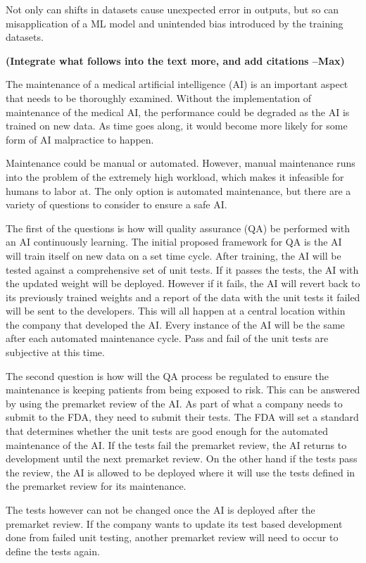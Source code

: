\documentclass[]{article}
\begin{document}
		Not only can shifts in datasets cause unexpected error in outputs, but so can misapplication of a ML model and unintended bias introduced by the training datasets.

		\textbf{(Integrate what follows into the text more, and add citations --Max)}

		The maintenance of a medical artificial intelligence (AI) is an important aspect that needs to be thoroughly examined. Without the implementation of maintenance of the medical AI, the performance could be degraded as the AI is trained on new data. As time goes along, it would become more likely for some form of AI malpractice to happen.
	
		Maintenance could be manual or automated. However, manual maintenance runs into the problem of the extremely high workload, which makes it infeasible for humans to labor at. The only option is automated maintenance, but there are a variety of questions to consider to ensure a safe AI.
	
		The first of the questions is how will quality assurance (QA) be performed with an AI continuously learning. The initial proposed framework for QA is the AI will train itself on new data on a set time cycle. After training, the AI will be tested against a comprehensive set of unit tests. If it passes the tests, the AI with the updated weight will be deployed. However if it fails, the AI will revert back to its previously trained weights and a report of the data with the unit tests it failed will be sent to the developers. This will all happen at a central location within the company that developed the AI. Every instance of the AI will be the same after each automated maintenance cycle. Pass and fail of the unit tests are subjective at this time.

		The second question is how will the QA process be regulated to ensure the maintenance is keeping patients from being exposed to risk. This can be answered by using the premarket review of the AI. As part of what a company needs to submit to the FDA, they need to submit their tests. The FDA will set a standard that determines whether the unit tests are good enough for the automated maintenance of the AI. If the tests fail the premarket review, the AI returns to development until the next premarket review. On the other hand if the tests pass the review, the AI is allowed to be deployed where it will use the tests defined in the premarket review for its maintenance.

		The tests however can not be changed once the AI is deployed after the premarket review. If the company wants to update its test based development done from failed unit testing, another premarket review will need to occur to define the tests again.
\end{document}
